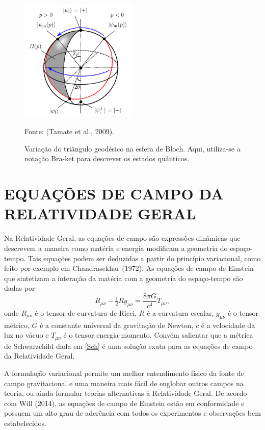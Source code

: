 \documentclass[a4,11pt]{report}
\begin{document}
\begin{figure}[!h]
\begin{center}
\caption{Variação do triângulo geodésico na esfera de Bloch. Aqui, utiliza-se a notação Bra-ket para descrever os estados quânticos.} \label{fig:01}
\includegraphics[width=0.5\textwidth]{bloch.png}
\end{center}
Fonte: (Tamate et al., 2009).
\end{figure}

\section{EQUAÇÕES DE CAMPO DA RELATIVIDADE GERAL}

Na Relatividade Geral, as equações de campo são expressões dinâmicas que descrevem a maneira como matéria e energia modificam a geometria do espaço-tempo. Tais equações podem ser deduzidas a partir do princípio variacional, como feito por exemplo em Chandrasekhar (1972). As equações de campo de Einstein que sintetizam a interação da matéria com a geometria do espaço-tempo são dadas por
\[R_{\mu \nu} - \tfrac{1}{2}R g_{\mu \nu} = \frac{8 \pi G }{c^4} T_{\mu \nu},\]
onde $R_{\mu \nu}$ é o tensor de curvatura de Ricci, $R$ é a curvatura escalar, $ g_{\mu \nu}$ é o tensor métrico, $G$ é a constante universal da gravitação de Newton, $c$ é a velocidade da luz no vácuo e $T_{\mu \nu}$ é o tensor energia-momento. Convém salientar que a métrica de Schwarzchild dada em \ref{Sch} é uma solução exata para as equações de campo da Relatividade Geral. 


A formulação variacional permite um melhor entendimento físico da fonte de campo gravitacional e uma maneira mais fácil de englobar outros campos na teoria, ou ainda formular teorias alternativas à Relatividade Geral. De acordo com Will (2014), as equações de campo de Einstein estão em conformidade e possuem um alto grau de aderência com todos os experimentos e observações bem estabelecidos. 
\end{document}
